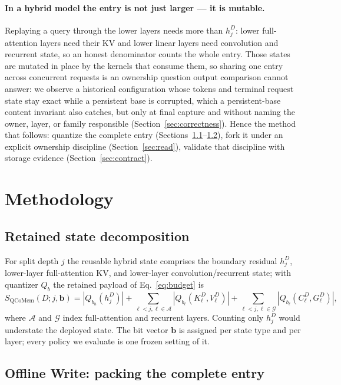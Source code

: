 \documentclass{article}
\begin{document}
\paragraph{In a hybrid model the entry is not just larger --- it is mutable.}
Replaying a query through the lower layers needs more than $h_j^D$: lower
full-attention layers need their KV and lower linear layers need convolution and
recurrent state, so an honest denominator counts the whole entry.  Those states
are mutated in place by the kernels that consume them, so sharing one entry
across concurrent requests is an ownership question output comparison cannot
answer: we observe a historical configuration whose tokens and terminal request
state stay exact while a persistent base is corrupted, which a persistent-base
content invariant also catches, but only at final capture and without naming the
owner, layer, or family responsible (Section~\ref{sec:correctness}).  Hence the
method that follows: quantize the complete entry
(Sections~\ref{sec:decomposition}--\ref{sec:write}), fork it under an explicit
ownership discipline (Section~\ref{sec:read}), validate that discipline with
storage evidence (Section~\ref{sec:contract}).

\section{Methodology}
\label{sec:method}

\subsection{Retained state decomposition}
\label{sec:decomposition}

For split depth $j$ the reusable hybrid state comprises the boundary residual
$h_j^D$, lower-layer full-attention KV, and lower-layer convolution/recurrent
state; with quantizer $Q_b$ the retained payload of Eq.~\ref{eq:budget} is
\begin{equation}
 S_{\mathrm{QCoMem}}(D;j,\mathbf b)=|Q_{b_h}(h_j^D)|+
 \sum_{\ell<j,\ell\in\mathcal A}|Q_{b_\ell}(K^D_\ell,V^D_\ell)|+
 \sum_{\ell<j,\ell\in\mathcal G}|Q_{b_\ell}(C^D_\ell,G^D_\ell)|,
\end{equation}
where $\mathcal A$ and $\mathcal G$ index full-attention and recurrent layers.
Counting only $h_j^D$ would understate the deployed state.  The bit vector
$\mathbf b$ is assigned per state type and per layer; every policy we evaluate
is one frozen setting of it.

\subsection{Offline Write: packing the complete entry}
\label{sec:write}
\end{document}
